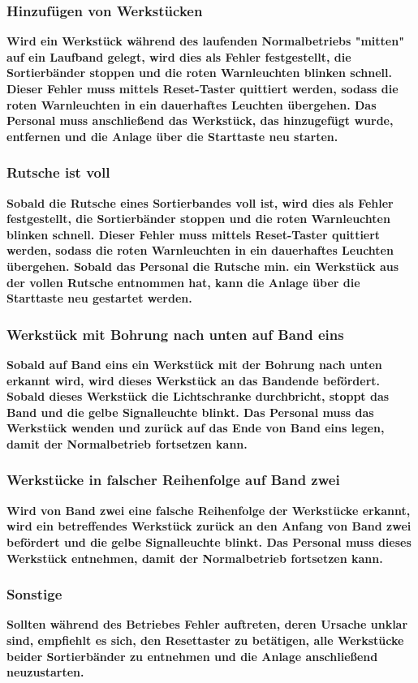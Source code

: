 \documentclass[oneside,a4paper,titlepage]{scrartcl} %
\begin{document}
\subsubsection{Hinzufügen von Werkstücken}
\textbf{Wird ein Werkstück während des laufenden Normalbetriebs "mitten" auf ein Laufband gelegt, wird dies als Fehler festgestellt, die Sortierbänder stoppen und die roten Warnleuchten blinken schnell. Dieser Fehler muss mittels Reset-Taster quittiert werden, sodass die roten Warnleuchten in ein dauerhaftes Leuchten übergehen. Das Personal muss anschließend das Werkstück, das hinzugefügt wurde, entfernen und die Anlage über die Starttaste neu starten.}

\subsubsection{Rutsche ist voll}
\textbf{Sobald die Rutsche eines Sortierbandes voll ist, wird dies als Fehler festgestellt, die Sortierbänder stoppen und die roten Warnleuchten blinken schnell. Dieser Fehler muss mittels Reset-Taster quittiert werden, sodass die roten Warnleuchten in ein dauerhaftes Leuchten übergehen. Sobald das Personal die Rutsche min. ein Werkstück aus der vollen Rutsche entnommen hat, kann die Anlage über die Starttaste neu gestartet werden. }

\subsubsection{Werkstück mit Bohrung nach unten auf Band eins}
\textbf{Sobald auf Band eins ein Werkstück mit der Bohrung nach unten erkannt wird, wird dieses Werkstück an das Bandende befördert. Sobald dieses Werkstück die Lichtschranke durchbricht, stoppt das Band und die gelbe Signalleuchte blinkt. Das Personal muss das Werkstück wenden und zurück auf das Ende von Band eins legen, damit der Normalbetrieb fortsetzen kann. }

\subsubsection{Werkstücke in falscher Reihenfolge auf Band zwei}
\textbf{Wird von Band zwei eine falsche Reihenfolge der Werkstücke erkannt, wird ein betreffendes Werkstück zurück an den Anfang von Band zwei befördert und die gelbe Signalleuchte blinkt. Das Personal muss dieses Werkstück entnehmen, damit der Normalbetrieb fortsetzen kann.}

\subsubsection{Sonstige}
\textbf{Sollten während des Betriebes Fehler auftreten, deren Ursache unklar sind, empfiehlt es sich, den Resettaster zu betätigen, alle Werkstücke beider Sortierbänder zu entnehmen und die Anlage anschließend neuzustarten.}
\end{document}

